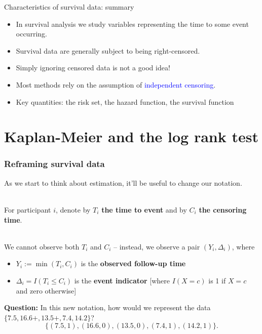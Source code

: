 \documentclass[10pt,t]{beamer}
\begin{document}
\begin{frame}{Characteristics of survival data: summary}
	\begin{itemize}
		\item In survival analysis we study variables representing the time to some event occurring.
		\item Survival data are generally subject to being right-censored.
		\item Simply ignoring censored data is not a good idea!
		\item Most methods rely on the assumption of \textcolor{blue}{independent censoring}.
		\item Key quantities: the risk set, the hazard function, the survival function
	\end{itemize}
\end{frame}

\section{Kaplan-Meier and the log rank test}

\begin{frame}
\frametitle{Reframing survival data}

As we start to think about estimation, it'll be useful to change our notation.
\\ ~\ 

For participant $i$, denote by $T_i$ \textbf{the time to event} and by $C_i$ \textbf{the censoring time}. \pause 
\\ ~\ 

We cannot observe both $T_i$ and $C_i$ -- instead, we observe a pair $(Y_i, \Delta_i)$, where \pause 
\begin{itemize}
\item $Y_i := \min(T_i, C_i)$ is the \textbf{observed follow-up time} \pause
\item $\Delta_i = I(T_i \leq C_i)$ is the \textbf{event indicator} [where $I(X = c)$ is 1 if $X = c$ and zero otherwise] \pause
\end{itemize}

\textbf{Question:} In this new notation, how would we represent the data $\{7.5, 16.6+, 13.5+, 7.4, 14.2\}$?\pause 
\[\{(7.5, 1), (16.6, 0), (13.5, 0), (7.4, 1), (14.2, 1)\}.\]
\end{frame}
\end{document}
